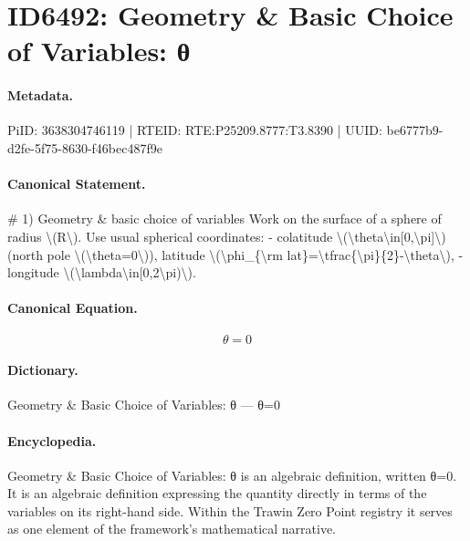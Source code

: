 \section*{ID6492: Geometry \& Basic Choice of Variables: θ}
\paragraph{Metadata.}
PiID: 3638304746119 | RTEID: RTE:P25209.8777:T3.8390 | UUID: be6777b9-d2fe-5f75-8630-f46bec487f9e

\paragraph{Canonical Statement.}
\# 1) Geometry \& basic choice of variables Work on the surface of a sphere of radius \textbackslash{}(R\textbackslash{}). Use usual spherical coordinates: - colatitude \textbackslash{}(\textbackslash{}theta\textbackslash{}in[0,\textbackslash{}pi]\textbackslash{}) (north pole \textbackslash{}(\textbackslash{}theta=0\textbackslash{})), latitude \textbackslash{}(\textbackslash{}phi\_\{\textbackslash{}rm lat\}=\textbackslash{}tfrac\{\textbackslash{}pi\}\{2\}-\textbackslash{}theta\textbackslash{}), - longitude \textbackslash{}(\textbackslash{}lambda\textbackslash{}in[0,2\textbackslash{}pi)\textbackslash{}).

\paragraph{Canonical Equation.}
\[
\theta=0
\]

\paragraph{Dictionary.}
Geometry \& Basic Choice of Variables: θ — θ=0

\paragraph{Encyclopedia.}
Geometry \& Basic Choice of Variables: θ is an algebraic definition, written θ=0. It is an algebraic definition expressing the quantity directly in terms of the variables on its right-hand side. Within the Trawin Zero Point registry it serves as one element of the framework's mathematical narrative.

